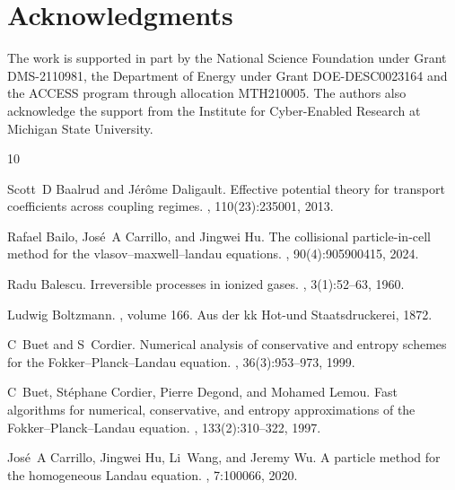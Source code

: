\documentclass[preprint,1p,times]{elsarticle}
\theoremstyle{definition}
\theoremstyle{remark}
\begin{document}
\section*{Acknowledgments}
The work is supported in part by the National Science Foundation under Grant DMS-2110981, the Department of Energy under
Grant DOE-DESC0023164 and the ACCESS program through allocation MTH210005. The
authors also acknowledge the support from the Institute for Cyber-Enabled Research at Michigan
State University.





%


\begin{thebibliography}{10}

Scott~D Baalrud and J{\'e}r{\^o}me Daligault.
\newblock Effective potential theory for transport coefficients across coupling
  regimes.
, 110(23):235001, 2013.

Rafael Bailo, Jos{\'e}~A Carrillo, and Jingwei Hu.
\newblock The collisional particle-in-cell method for the
  vlasov--maxwell--landau equations.
, 90(4):905900415, 2024.

Radu Balescu.
\newblock Irreversible processes in ionized gases.
, 3(1):52--63, 1960.

Ludwig Boltzmann.
, volume 166.
\newblock Aus der kk Hot-und Staatsdruckerei, 1872.

C~Buet and S~Cordier.
\newblock Numerical analysis of conservative and entropy schemes for the
  {F}okker--{P}lanck--{L}andau equation.
, 36(3):953--973, 1999.

C~Buet, St{\'e}phane Cordier, Pierre Degond, and Mohamed Lemou.
\newblock Fast algorithms for numerical, conservative, and entropy
  approximations of the {F}okker--{P}lanck--{L}andau equation.
, 133(2):310--322, 1997.

Jos{\'e}~A Carrillo, Jingwei Hu, Li~Wang, and Jeremy Wu.
\newblock A particle method for the homogeneous {L}andau equation.
, 7:100066, 2020.


\end{thebibliography}
\end{document}
